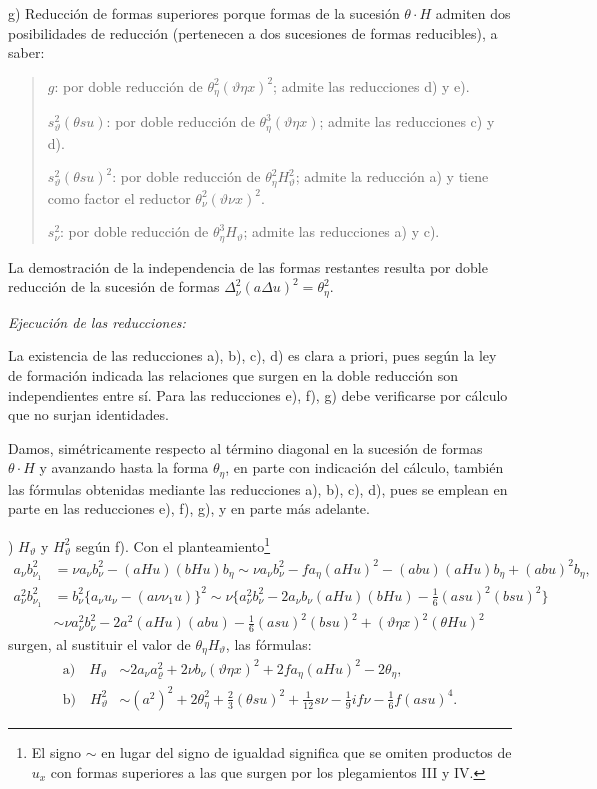 \documentclass[11pt]{article}
\newcommand{\A}{\Delta}
\newcommand{\R}{\varrho}
\begin{document}
g) Reducción de formas superiores porque formas de la sucesión $\theta\cdot H$ admiten dos posibilidades de reducción (pertenecen a dos sucesiones de formas reducibles), a saber:
\begin{quote}\small
$g$: por doble reducción de $\theta_\eta^2(\vartheta\eta x)^2$; admite las reducciones d) y e).\par
$s_\vartheta^2(\theta su)$: por doble reducción de $\theta_\eta^3(\vartheta\eta x)$; admite las reducciones c) y d).\par
$s_\vartheta^2(\theta su)^2$: por doble reducción de $\theta_\eta^2H_\vartheta^2$; admite la reducción a) y tiene como factor el reductor $\theta_\nu^2(\vartheta\nu x)^2$.\par
$s_\nu^2$: por doble reducción de $\theta_\eta^3H_\vartheta$; admite las reducciones a) y c).
\end{quote}
La demostración de la independencia de las formas restantes resulta por doble reducción de la sucesión de formas $\A_\nu^2(a\A u)^2=\theta_\eta^2$.

\noindent\emph{Ejecución de las reducciones:}

La existencia de las reducciones a), b), c), d) es clara a priori, pues según la ley de formación indicada las relaciones que surgen en la doble reducción son independientes entre sí. Para las reducciones e), f), g) debe verificarse por cálculo que no surjan identidades.

Damos, simétricamente respecto al término diagonal en la sucesión de formas $\theta\cdot H$ y avanzando hasta la forma $\theta_\eta$, en parte con indicación del cálculo, también las fórmulas obtenidas mediante las reducciones a), b), c), d), pues se emplean en parte en las reducciones e), f), g), y en parte más adelante.

) $H_\vartheta$ y $H_\vartheta^2$ según f). Con el planteamiento\footnote{El signo $\sim$ en lugar del signo de igualdad significa que se omiten productos de $u_x$ con formas superiores a las que surgen por los plegamientos III y IV.}
\[
\begin{aligned}
a_\nu b_{\nu_1}^2
&=\nu a_\nu b_\nu^2-(aHu)(bHu)b_\eta
\sim \nu a_\nu b_\nu^2-f a_\eta(aHu)^2-(abu)(aHu)b_\eta+(abu)^2b_\eta,\\
a_\nu^2b_{\nu_1}^2
&=b_\nu^2\{a_\nu u_\nu-(a\nu\nu_1u)\}^2
\sim \nu\{a_\nu^2b_\nu^2-2a_\nu b_\nu(aHu)(bHu)
-\frac16(asu)^2(bsu)^2\}\\
&\sim \nu a_\nu^2b_\nu^2-2a^2(aHu)(abu)-\frac16(asu)^2(bsu)^2+(\vartheta\eta x)^2(\theta Hu)^2
\end{aligned}
\]
surgen, al sustituir el valor de $\theta_\eta H_\vartheta$, las fórmulas:
\[
\tag{12}
\begin{aligned}
\text{a)}\quad H_\vartheta&\sim 2a_\nu a_\R^2+2\nu b_\nu(\vartheta\eta x)^2+2f a_\eta(aHu)^2-2\theta_\eta,\\
\text{b)}\quad H_\vartheta^2&\sim (a^2)^2+2\theta_\eta^2+\frac23(\theta su)^2
+\frac1{12}s\nu-\frac19if\nu-\frac16f(asu)^4.
\end{aligned}
\]
\end{document}
